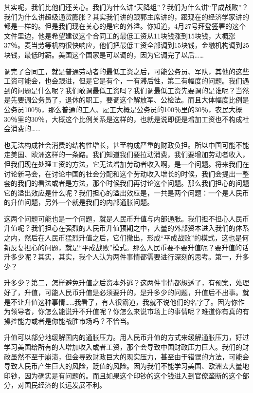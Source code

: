 \documentclass[UTF8, 12pt, a4paper]{ctexrep}
\begin{document}
其实呢，我们比他们还关心。我们为什么讲“天降组”？我们为什么讲“平成战败”？我们为什么讲超级通货膨胀？其实我们讲的跟郭主席讲的，跟现在的经济学家讲的都是一样的。但是我们现在关心的是它的外溢。你知道，4月27号拜登签署的这个文件里边，他是希望建议这个合同工的最低工资从11块钱涨到15块钱，大概涨37％。麦当劳等机构很快响应，他们把最低工资全部调到15块钱，金融机构调到25块钱，最低时薪。美国这个国家是可以调的，因为它调完了以后……

调完了合同工，就是普通劳动者的最低工资之后，可能公务员、军队，其他的这些工资可能会，也会跟进，但是它是有个，一有滞后性，第二有幅度的问题。我们遇到的问题是什么呢？我们敢调最低工资吗？我们调最低工资先要调的是谁呢？当然是先要调公务员了，退休的职工，要调这个解放军、公检法。而且大体幅度比例是公务员100％，那么普通的工人、雇工大概是公务员的100％里的30％，农民大概30％里的30％，大概这个比例关系是这样的，也就是说即便是增加工资也不构成社会消费的……

也无法构成社会消费的结构性增长，甚至构成严重的财政负担。所以中国可能不能走美国、欧洲这样的一条路。我们知道我们要拉动消费，我们要增加劳动者收入，但我们现在处理工资的方法，它无法增加劳动者收入啊，是一个问题。将来我们在讨论新马会，在讨论中国的社会分配和这个劳动收入增长的时候，我们会提出一整套的我们的看法或者是方法，那个时候我们再讨论这个问题。那么我们担心的问题它的溢出效应是什么呢？我们担心的溢出效应是，一共是两个问题：一个是人民币的升值问题，另外一个就是我们的内部通胀问题。

这两个问题可能也是一个问题，就是人民币升值与内部通胀。我们担不担心人民币升值呢？我们担心在强烈的人民币升值预期之中，大量的外部资本进入我们的体系之内，然后在人民币猛烈升值之后，它们撤出，形成“平成战败”的模式，这也是何新反复担心的问题，就是“平成战败”模式。那么人民币要不要升值呢？要升值的话升多少呢？其实，其实，我个人认为两件事情都需要进行深刻的思考。第一，升多少？

升多少？第二，怎样避免升值之后资本外逃？这两件事情都想透了，有预案，处理好了，升值，可能人民币升值是必须要升的，是升多少的问题，升值后不出事。就是不让升值这种事情……我看了，有人很霸道，我就不说他们的名字了。因为你作为领导者，你怎么能说升不升值呢？你怎么来说市场上的事情呢？难道你有真的有操控能力或者是你能战胜市场吗？不恰当。

升值可以部分地缓解国内的通胀压力。用人民币升值的方式来缓解通胀压力，好过学习美国给所有的人增加收入或者工资，那个会导致中国财政压力巨大。我们的财政虽然不至于崩溃，但会导致财政巨大的现实压力，甚至由于错误的方法，可能会导致人民币产生巨大的风险，贬值的风险。因为我们不能学习美国、欧洲去大量地印钞，因为确实是有问题的。而且如果这个印钞的这个钱进入到官僚垄断的这个部分，对国民经济的长远发展不利。
\end{document}
